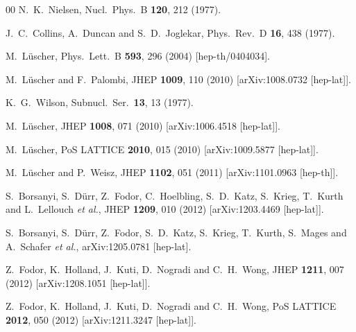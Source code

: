 \begin{thebibliography}{00}
  N.~K.~Nielsen,
  Nucl.\ Phys.\ B {\bf 120}, 212 (1977).

  J.~C.~Collins, A.~Duncan and S.~D.~Joglekar,
  Phys.\ Rev.\ D {\bf 16}, 438 (1977).

  M.~L\"uscher,
  Phys.\ Lett.\ B {\bf 593}, 296 (2004)
  [hep-th/0404034].

  M.~L\"uscher and F.~Palombi,
  JHEP {\bf 1009}, 110 (2010)
  [arXiv:1008.0732 [hep-lat]].

  K.~G.~Wilson,
  Subnucl.\ Ser.\  {\bf 13}, 13 (1977).

  M.~L\"uscher,
  JHEP {\bf 1008}, 071 (2010)
  [arXiv:1006.4518 [hep-lat]].

  M.~L\"uscher,
  PoS LATTICE {\bf 2010}, 015 (2010)
  [arXiv:1009.5877 [hep-lat]].

  M.~L\"uscher and P.~Weisz,
  JHEP {\bf 1102}, 051 (2011)
  [arXiv:1101.0963 [hep-th]].

  S.~Borsanyi, S.~D\"urr, Z.~Fodor, C.~Hoelbling, S.~D.~Katz, S.~Krieg, T.~Kurth and L.~Lellouch {\it et al.},
  JHEP {\bf 1209}, 010 (2012)
  [arXiv:1203.4469 [hep-lat]].

  S.~Borsanyi, S.~D\"urr, Z.~Fodor, S.~D.~Katz, S.~Krieg, T.~Kurth, S.~Mages and A.~Schafer {\it et al.},
  arXiv:1205.0781 [hep-lat].

  Z.~Fodor, K.~Holland, J.~Kuti, D.~Nogradi and C.~H.~Wong,
  JHEP {\bf 1211}, 007 (2012)
  [arXiv:1208.1051 [hep-lat]].

  Z.~Fodor, K.~Holland, J.~Kuti, D.~Nogradi and C.~H.~Wong,
  PoS LATTICE {\bf 2012}, 050 (2012)
  [arXiv:1211.3247 [hep-lat]].


\end{thebibliography}
